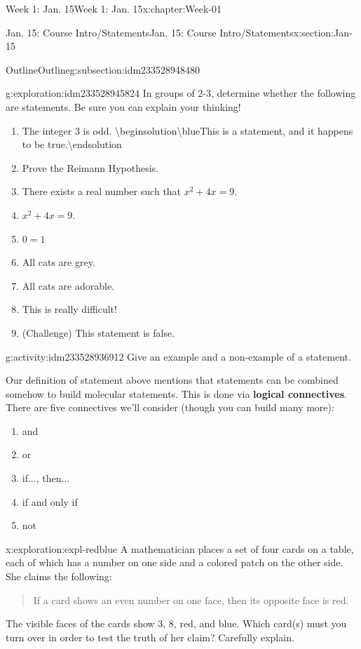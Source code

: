 \documentclass[oneside,10pt,]{book}
\newcommand{\terminology}[1]{\textbf{#1}}
\numberwithin{equation}{section}
\begin{document}
\begin{chapterptx}{Week 1: Jan. 15}{}{Week 1: Jan. 15}{}{}{x:chapter:Week-01}
\begin{sectionptx}{Jan. 15: Course Intro\slash{}Statements}{}{Jan. 15: Course Intro\slash{}Statements}{}{}{x:section:Jan-15}
\begin{subsectionptx}{Outline}{}{Outline}{}{}{g:subsection:idm233528948480}
\begin{exploration}{}{g:exploration:idm233528945824}%
In groups of 2-3, determine whether the following are statements. Be sure you can explain your thinking!%
\begin{enumerate}
\item{}The integer 3 is odd.%
 \textbackslash{}begin\textbraceleft{}solution\textbraceright{}\textbackslash{}blue\textbraceleft{}This is a statement, and it happens to be true.\textbraceright{}\textbackslash{}end\textbraceleft{}solution\textbraceright{} \item{}Prove the Reimann Hypothesis.%
\item{}There exists a real number such that \(x^2 + 4x= 9\).%
\item{}\(x^2+4x=9\).%
\item{}\(\displaystyle 0=1\)%
\item{}All cats are grey.%
\item{}All cats are adorable.%
\item{}This is really difficult!%
\item{}(Challenge) This statement is false.%
\end{enumerate}
%
\end{exploration}%
\begin{activity}{}{g:activity:idm233528936912}%
Give an example and a non-example of a statement.%
\end{activity}%
Our definition of statement above mentions that statements can be combined somehow to build molecular statements. This is done via \terminology{logical connectives}. There are five connectives we'll consider (though you can build many more):%
%
\begin{enumerate}
\item{}and%
\item{}or%
\item{}if..., then...%
\item{}if and only if%
\item{}not%
\end{enumerate}
\begin{exploration}{}{x:exploration:expl-redblue}%
A mathematician places a set of four cards on a table, each of which has a number on one side and a colored patch on the other side. She claims the following: \begin{quote}%
If a card shows an even number on one face, then its opposite face is red.\end{quote}
 The visible faces of the cards show 3, 8, red, and blue. Which card(s) must you turn over in order to test the truth of her claim? Carefully explain.%

\end{exploration}
\end{subsectionptx}
\end{sectionptx}
\end{chapterptx}
\end{document}
